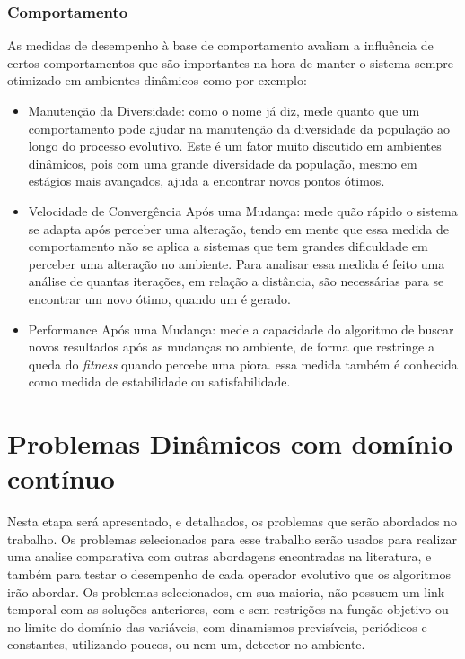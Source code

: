 \subsubsection{Comportamento}
As medidas de desempenho à base de comportamento avaliam a influência de certos comportamentos que são importantes na hora de manter o sistema sempre otimizado em ambientes dinâmicos como por exemplo:

\begin{itemize}
\item Manutenção da Diversidade: como o nome já diz, mede quanto que um comportamento pode ajudar na manutenção da diversidade da população ao longo do processo evolutivo. Este é um fator muito discutido em ambientes dinâmicos, pois com uma grande diversidade da população, mesmo em estágios mais avançados, ajuda a encontrar novos pontos ótimos.

\item Velocidade de Convergência Após uma Mudança: mede quão rápido o sistema se adapta após perceber uma alteração, tendo em mente que essa medida de comportamento não se aplica a sistemas que tem grandes dificuldade em perceber uma alteração no ambiente. Para analisar essa medida é feito uma análise de quantas iterações, em relação a distância, são necessárias para se encontrar um novo ótimo, quando um é gerado.

\item Performance Após uma Mudança: mede a capacidade do algoritmo de buscar novos resultados após as mudanças no ambiente, de forma que restringe a queda do \textit{fitness} quando percebe uma piora. essa medida também é conhecida como medida de estabilidade ou satisfabilidade.
\end{itemize}

\section{Problemas Dinâmicos com domínio contínuo}
\label{sec:revisao_dinamic_problems}
Nesta etapa será apresentado, e detalhados, os problemas que serão abordados no trabalho. Os problemas selecionados para esse trabalho serão usados para realizar uma analise comparativa com outras abordagens encontradas na literatura, e também para testar o desempenho de cada operador evolutivo que os algoritmos irão abordar.
Os problemas selecionados, em sua maioria, não possuem um link temporal com as soluções anteriores, com e sem restrições na função objetivo ou no limite do domínio das variáveis, com dinamismos previsíveis, periódicos e constantes, utilizando poucos, ou nem um, detector no ambiente.

